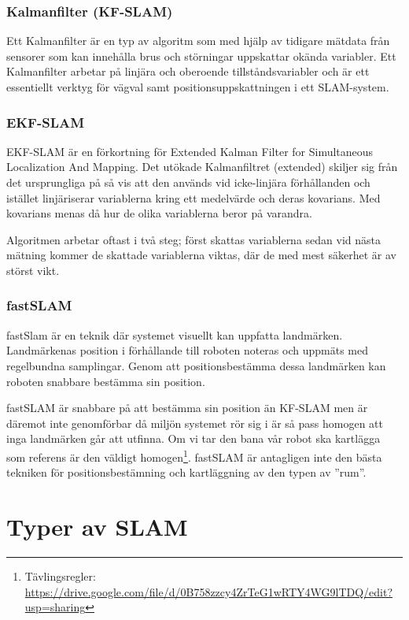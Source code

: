 \documentclass[a4paper,12pt,fleqn]{article}
\begin{document}
\subsubsection{Kalmanfilter (KF-SLAM)}
Ett Kalmanfilter är en typ av algoritm som med hjälp av tidigare mätdata från sensorer som kan innehålla brus och störningar uppskattar okända variabler. Ett Kalmanfilter arbetar på linjära och oberoende tillståndsvariabler och är ett essentiellt verktyg för vägval samt positionsuppskattningen i ett SLAM-system. 

\subsubsection{EKF-SLAM} 
EKF-SLAM är en förkortning för Extended Kalman Filter for Simultaneous Localization And Mapping. Det utökade Kalmanfiltret (extended) skiljer sig från det ursprungliga på så vis att den används vid icke-linjära förhållanden och istället linjäriserar variablerna kring ett medelvärde och deras kovarians. Med kovarians menas då hur de olika variablerna beror på varandra.

Algoritmen arbetar oftast i två steg; först skattas variablerna sedan vid nästa mätning 
kommer de skattade variablerna viktas, där de med mest säkerhet är av störst vikt.

\subsubsection{fastSLAM}
fastSlam är en teknik där systemet visuellt kan uppfatta landmärken. Landmärkenas position i förhållande till roboten noteras och uppmäts med regelbundna samplingar. Genom att positionsbestämma dessa landmärken kan roboten snabbare bestämma sin position. 

fastSLAM är snabbare på att bestämma sin position än KF-SLAM men är däremot inte genomförbar då miljön systemet rör sig i är så pass homogen att inga landmärken går att utfinna. Om vi tar den bana vår robot ska kartlägga som referens är den väldigt homogen\footnote{Tävlingsregler: \url{https://drive.google.com/file/d/0B758zzcy4ZrTeG1wRTY4WG9lTDQ/edit?usp=sharing}}. fastSLAM är antagligen inte den bästa tekniken för positionsbestämning och kartläggning av den typen av ''rum''. 


\section{Typer av SLAM}
\end{document}
